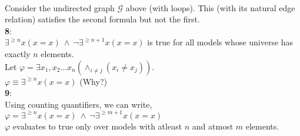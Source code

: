 \documentclass{article}
\begin{document}
\begin{flushleft}
\begin{tikzpicture}[x=0.75pt,y=0.75pt,yscale=-1,xscale=1]
\end{tikzpicture}\\
\vspace{2mm}
Consider the undirected graph $\mathcal{G}$ above (with loops). This (with its natural edge relation) satisfies the second formula but not the first.\\
\textbf{8}: \\$\exists^{\geq n}x(x=x)\:\wedge\:\neg\exists ^{\geq n+1}x(x=x)$ is true for all models whose universe has exactly $n$ elements.\\
Let $\varphi= \exists x_1, x_2\dots x_n(\wedge^{}_{i\neq j}(x_i\neq x_j))$.\\
$\varphi \equiv \exists^{\geq n}x(x=x)$ (Why?)\\
\textbf{9}:\\
Using counting quantifiers, we can write,\\
$\varphi= \exists^{\geq n}x(x=x)\:\wedge\:\neg\exists ^{\geq m+1}x(x=x)$\\
$\varphi$ evaluates to true only over models with atleast $n$ and atmost $m$ elements.
\end{flushleft}
\end{document}
